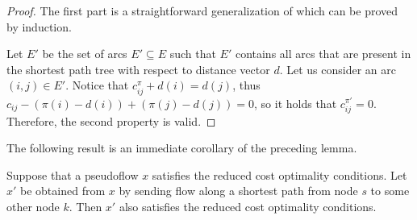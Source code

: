\begin{proof}
    The first part is a straightforward generalization of  which can be proved by induction.

    Let $E'$ be the set of arcs $E' \subseteq E$ such that $E'$ contains all arcs that are present in the shortest path tree with respect to distance vector $d$. 
    Let us consider an arc $(i,j) \in E'$. Notice that $c^\pi_{ij} + d(i) = d(j)$, thus $c_{ij} - (\pi(i) - d(i)) + (\pi(j) -d(j)) = 0$, so it holds that $c^{\pi'}_{ij} = 0$. Therefore, the second property is valid.
\end{proof}
The following result is an immediate corollary of the preceding lemma.
\begin{lemma}
\label{shortest-optimality}
    Suppose that a pseudoflow $x$ satisfies the reduced cost optimality conditions. Let $x'$ be obtained from $x$ by sending flow along a shortest path from node $s$ to some other node $k$. Then $x'$ also satisfies the reduced cost optimality conditions.
    
\end{lemma}

